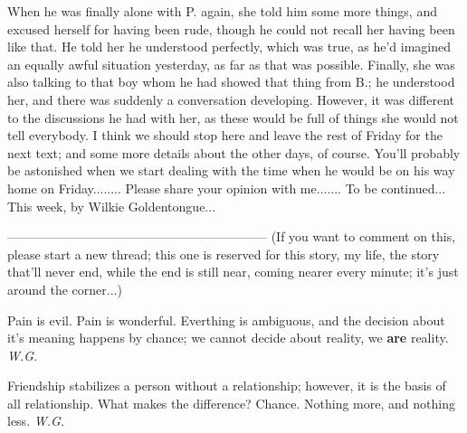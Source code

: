 When he was finally alone with P. again, she told him some more things, and excused herself for having been rude, though he could not recall her having been like that. He told her he understood perfectly, which was true, as he'd imagined an equally awful situation yesterday, as far as that was possible. Finally, she was also talking to that boy whom he had showed that thing from B.; he understood her, and there was suddenly a conversation developing. However, it was different to the discussions he had with her, as these would be full of things she would not tell everybody. 
I think we should stop here and leave the rest of Friday for the next text; and some more details about the other days, of course. You'll probably be astonished when we start dealing with the time when he would be on his way home on Friday........
Please share your opinion with me.......
To be continued...
This week, by Wilkie Goldentongue...

--------------------------------------------------------------
(If you want to comment on this, please start a new thread; this one is reserved for this story, my life, the story that'll never end, while the end is still near, coming nearer every minute; it's just around the corner...)

Pain 
is evil. 
Pain 
is wonderful. 
Everthing is ambiguous, 
and the decision about it's meaning 
happens by chance; 
we cannot decide about reality, 
we \textbf{are} reality. 
\emph{W.G.}

Friendship 
stabilizes a person without a relationship; 
however, it is the basis of all relationship. 
What makes the difference? 
Chance. 
Nothing more, 
and nothing less. 
\emph{W.G.}

